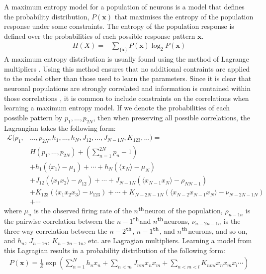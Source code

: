 \documentclass[a4paper,12pt]{article}
\theoremstyle{definition}
\newcommand{\upperth}{$^{\mbox{\footnotesize{th}}}$}%
\begin{document}
	A maximum entropy model for a population of neurons is a model that defines the probability distribution, $P(\mathbf{x})$ that maximises the entropy of the population response under some constraints. The entropy of the population response is defined over the probabilities of each possible response pattern $\mathbf{x}$.
	\begin{align}
	H(X) = - \sum_{\lbrace \mathbf{x} \rbrace} P(\mathbf{x}) \log _2 P(\mathbf{x})
	\end{align}
	A maximum entropy distribution is usually found using the method of Lagrange multipliers \cite{jaynes}. Using this method ensures that no additional contraints are applied to the model other than those used to learn the parameters. Since it is clear that neuronal populations are strongly correlated and information is contained within those correlations \cite{zohary, schwartz}, it is common to include constraints on the correlations when learning a maximum entropy model. If we denote the probabilities of each possible pattern by $p_1, \dots, p_{2N}$, then when preserving all possible correlations, the Lagrangian takes the following form:
	\begin{align}
	\mathcal{L}(p_1, &\dots, p_{2N}, h_1, \dots, h_N, J_{12}, \dots, J_{N-1 N}, K_{123}, \dots) = \nonumber \\ 
	&H(p_1, \dots, p_{2N}) + \left(\sum_{n=1}^{2N} p_n - 1 \right) \nonumber \\ 
	&+ h_1(\langle x_1 \rangle - \mu_1) + \cdots + h_N(\langle x_N \rangle - \mu_N) \label{lagrangian} \\ 
	&+ J_{12}(\langle x_1 x_2 \rangle - \rho_{12}) + \cdots + J_{N-1 N} (\langle x_{N-1} x_N \rangle  - \rho_{N N-1}) \nonumber \\
	&+ K_{123}(\langle x_1 x_2 x_3 \rangle - \nu_{123}) + \cdots + K_{N-2 N-1 N}(\langle x_{N-2} x_{N-1} x_N \rangle - \nu_{N-2 N-1 N}) \nonumber \\
	&+ \cdots \nonumber
	\end{align}
	where $\mu_n$ is the observed firing rate of the $n$\upperth neuron of the population, $\rho_{n-1 n}$ is the pairwise correlation between the $n-1$\upperth and $n$\upperth neurons, $\nu_{n-2 n-1 n}$ is the three-way correlation between the $n-2$\upperth, $n-1$\upperth, and $n$\upperth neurons, and so on, and $h_n$, $J_{n-1 n}$, $K_{n-2 n-1 n}$, etc. are Lagragian multipliers. Learning a model from this Lagragian results in a probability distribution of the following form:
	\begin{align}
	P(\mathbf{x}) = \frac{1}{Z}\exp \left(\sum_{n=1}^N h_n x_n + \sum_{n<m} J_{nm} x_n x_m + \sum_{n<m<l}K_{nml}x_n x_m x_l \cdots \right) \label{distribution}
	\end{align}
\end{document}
